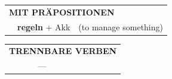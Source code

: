 \documentclass[10pt,a4paper]{revtex4-2}
\begin{document}
\begin{verbbox}
\vspace{10pt}

\begin{tabular}{lll}
\multicolumn{3}{l}{\textbf{MIT PRÄPOSITIONEN}}\\
& \textbf{regeln} + Akk & (to manage something)\\
\end{tabular}
\hfill
\begin{tabular}{lll}
\multicolumn{3}{l}{\textbf{TRENNBARE VERBEN}}\\
& ---\\
\end{tabular}

\vspace{-5pt}
\end{verbbox}
\end{document}
